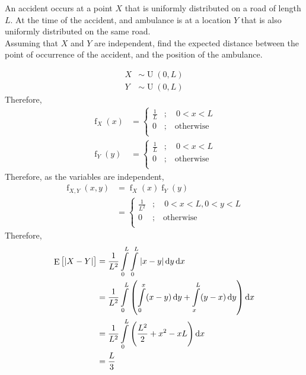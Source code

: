 \documentclass[titlepage, fleqn, a4paper, 12pt, twoside]{article}
\theoremstyle{definition}
\theoremstyle{theorem}
\DeclareMathOperator{\expct}{\mathrm{E}}
\DeclareMathOperator{\pdf}{\mathrm{f}}
\DeclareMathOperator{\uniform}{\mathrm{U}}
\begin{document}
\begin{question}
	An accident occurs at a point $X$ that is uniformly distributed on a road of length $L$.
	At the time of the accident, and ambulance is at a location $Y$ that is also uniformly distributed on the same road.\\
	Assuming that $X$ and $Y$ are independent, find the expected distance between the point of occurrence of the accident, and the position of the ambulance.
\end{question}

\begin{solution}
	\begin{align*}
		X & \sim \uniform(0,L) \\
		Y & \sim \uniform(0,L)
	\end{align*}
	Therefore,
	\begin{align*}
		\pdf_X(x) &=
			\begin{cases}
				\frac{1}{L} & ;\quad 0 < x < L        \\
				0           & ;\quad \text{otherwise} \\
			\end{cases}\\
		\pdf_Y(y) &=
			\begin{cases}
				\frac{1}{L} & ;\quad 0 < x < L        \\
				0           & ;\quad \text{otherwise} \\
			\end{cases}
	\end{align*}
	Therefore, as the variables are independent,
	\begin{align*}
		\pdf_{X,Y}(x,y) &= \pdf_X(x) \pdf_Y(y)\\
		&=
			\begin{cases}
				\frac{1}{L^2} & ;\quad 0 < x < L , 0 < y < L \\
				0             & ;\quad \text{otherwise}      \\
			\end{cases}
	\end{align*}
	Therefore,
	\begin{align*}
		\expct\left[ |X - Y| \right] & = \frac{1}{L^2} \int\limits_{0}^{L} \int\limits_{0}^{L} |x - y| \dif y \dif x                                                     \\
                                             & = \frac{1}{L^2} \int\limits_{0}^{L} \left( \int\limits_{0}^{x} (x - y) \dif y + \int\limits_{x}^{L} (y - x) \dif y \right) \dif x \\
                                             & = \frac{1}{L^2} \int\limits_{0}^{L} \left( \frac{L^2}{2} + x^2 - x L \right) \dif x                                               \\
                                             & = \frac{L}{3}
	\end{align*}
\end{solution}
\end{document}
